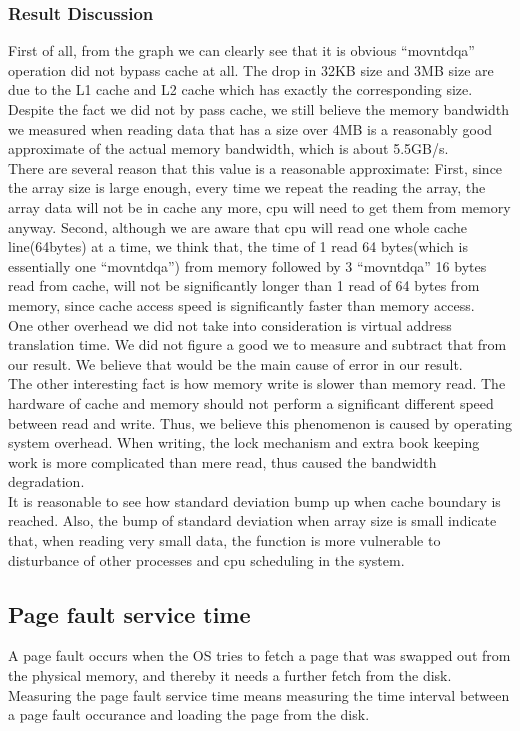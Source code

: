 \documentclass{article} %
\begin{document}
\subsubsection{Result Discussion}
First of all, from the graph we can clearly see that it is obvious ``movntdqa'' operation did not bypass cache at all. The drop in 32KB size and 3MB size are due to the L1 cache and L2 cache which has exactly the corresponding size. Despite the fact we did not by pass cache, we still believe the memory bandwidth we measured when reading data that has a size over 4MB is a reasonably good approximate of the actual memory bandwidth, which is about 5.5GB/s.\\
There are several reason that this value is a reasonable approximate: First, since the array size is large enough, every time we repeat the reading the array, the array data will not be in cache any more, cpu will need to get them from memory anyway. Second, although we are aware that cpu will read one whole cache line(64bytes) at a time, we think that, the time of 1 read 64 bytes(which is essentially one ``movntdqa'') from memory followed by 3 ``movntdqa'' 16 bytes read from cache, will not be significantly longer than 1 read of 64 bytes from memory, since cache access speed is significantly faster than memory access.\\
One other overhead we did not take into consideration is virtual address translation time. We did not figure a good we to measure and subtract that from our result. We believe that would be the main cause of error in our result.\\
The other interesting fact is how memory write is slower than memory read. The hardware of cache and memory should not perform a significant different speed between read and write. Thus, we believe this phenomenon is caused by operating system overhead. When writing, the lock mechanism and extra book keeping work is more complicated than mere read, thus caused the bandwidth degradation.\\
It is reasonable to see how standard deviation bump up when cache boundary is reached. Also, the bump of standard deviation when array size is small indicate that, when reading very small data, the function is more vulnerable to disturbance of other processes and cpu scheduling in the system.\\

\subsection{Page fault service time}
A page fault occurs when the OS tries to fetch a page that was swapped out from the physical memory, and thereby it needs a further fetch from the disk. Measuring the page fault service time means measuring the time interval between a page fault occurance and loading the page from the disk.
\end{document}
